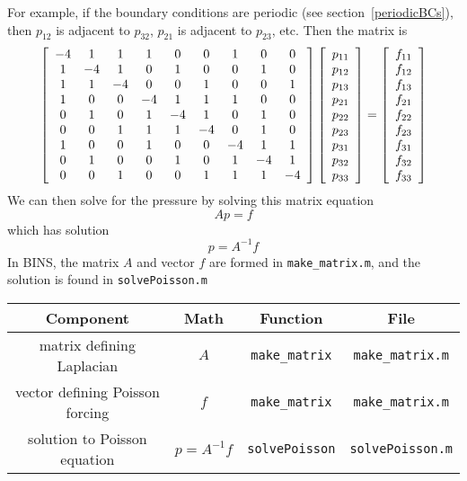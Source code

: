 \documentclass[12pt]{article}
\begin{document}
For example, if the boundary conditions are periodic (see section~\ref{periodicBCs}), then $p_{12}$ is adjacent to $p_{32}$, $p_{21}$ is adjacent to $p_{23}$, etc.  Then the matrix is
\[ \left[ \begin{array}{c c c c c c c c c} 
-4&1&1&1&0&0&1&0&0\\ 
1&-4&1&0&1&0&0&1&0\\ 
1&1&-4&0&0&1&0&0&1\\ 
1&0&0&-4&1&1&1&0&0\\ 
0&1&0&1&-4&1&0&1&0 \\ 
0&0&1&1&1&-4&0&1&0\\ 
1&0&0&1&0&0&-4&1&1\\ 
0&1&0&0&1&0&1&-4&1\\ 
0&0&1&0&0&1&1&1&-4\\ \end{array} \right] \left[ \begin{array}{c} p_{11}\\p_{12}\\p_{13}\\p_{21}\\p_{22}\\p_{23}\\p_{31}\\p_{32}\\p_{33}\\ \end{array}\right] = \left[ \begin{array}{c} f_{11}\\f_{12}\\f_{13}\\f_{21}\\f_{22}\\f_{23}\\f_{31}\\f_{32}\\f_{33}\\ \end{array}\right]
\]
We can then solve for the pressure by solving this matrix equation
\[ Ap = f\]
which has solution
\[ p = A^{-1}f\]
In BINS, the matrix $A$ and vector $f$ are formed in \texttt{make\_matrix.m}, and the solution is found in \texttt{solvePoisson.m}
\begin{center}
\begin{tabular}{|c|c|c|c|}
\hline 
\bf{Component} & \bf{Math} & \bf{Function} & \bf{File}\\ 
\hline 
matrix defining Laplacian & $A$ & \texttt{make\_matrix} & \texttt{make\_matrix.m}\\ 
\hline 
vector defining Poisson forcing & $f$ & \texttt{make\_matrix} & \texttt{make\_matrix.m}\\ 
\hline 
solution to Poisson equation & $p = A^{-1}f$ & \texttt{solvePoisson} & \texttt{solvePoisson.m}\\ 
\hline 
\end{tabular} 
\end{center}
\end{document}
